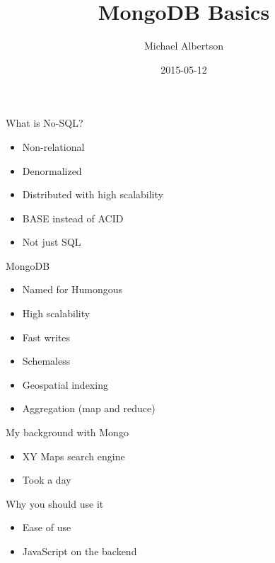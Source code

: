 \documentclass{beamer}
\title{MongoDB Basics}
\author{Michael Albertson}
\date{2015-05-12}%
\begin{document}
\begin{frame}%

\maketitle

\end{frame}


\begin{frame}{What is No-SQL?}

\begin{itemize}
\item Non-relational
\item Denormalized
\item Distributed with high scalability
\item BASE instead of ACID %
\item Not just SQL
\end{itemize}

\end{frame}


\begin{frame}{MongoDB}

\begin{itemize}
\item Named for Humongous
\item High scalability
\item Fast writes
\item Schemaless
\item Geospatial indexing
\item Aggregation (map and reduce)
\end{itemize}

\end{frame}


\begin{frame}{My background with Mongo}

\begin{itemize}
\item XY Maps search engine
\item Took a day
\end{itemize}


\end{frame}


\begin{frame}{Why you should use it}

\begin{itemize}
\item Ease of use
\item JavaScript on the backend
\end{itemize}

\end{frame}
\end{document}

